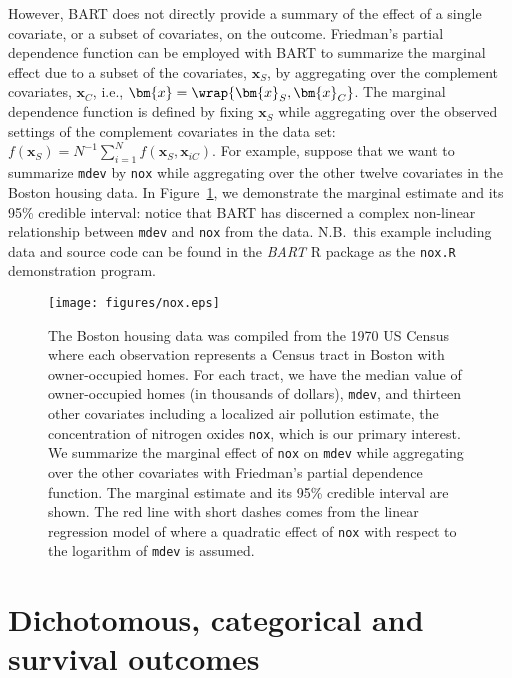 \documentclass[cmbright,doublespace]{WileySTAT-V1}
\theoremstyle{plain}
\begin{document}
However, BART does not directly provide a summary of the effect of a
single covariate, or a subset of covariates, on the outcome.
Friedman's partial dependence function \citep{Frie01} can be employed
with BART to summarize the marginal effect due to a subset of the
covariates, $\bm{x}_S$, by aggregating over the complement covariates,
$\bm{x}_C$, i.e., $\bm{x} =\wrap{\bm{x}_S,\bm{x}_C}$. The marginal
dependence function is defined by fixing $\bm{x}_S$ while aggregating
over the observed settings of the complement covariates in the data
set: $f(\bm{x}_S)={N^{-1}}\sum_{i=1}^N f(\bm{x}_S,\bm{x}_{iC})$.  For
example, suppose that we want to summarize {\tt mdev} by {\tt nox}
while aggregating over the other twelve covariates in the Boston
housing data.  In Figure~\ref{nox}, we demonstrate the marginal
estimate and its 95\% credible interval: notice that BART has
discerned a complex non-linear relationship between {\tt mdev} and
{\tt nox} from the data.  N.B.\ this example including data and source
code can be found in the {\it BART} R package \citep{McCuSpar19} as
the {\tt nox.R} demonstration program.
\begin{figure}[h]
\begin{center}
\texttt{[image: figures/nox.eps]}
\end{center}
\caption{\label{nox}The Boston housing data was compiled from the 1970
  US Census where each observation represents a Census tract in Boston
  with owner-occupied homes. For each tract, we have the median value
  of owner-occupied homes (in thousands of dollars), {\tt mdev}, and
  thirteen other covariates including a localized air pollution
  estimate, the concentration of nitrogen oxides {\tt nox}, which is
  our primary interest.  We summarize the marginal effect of {\tt nox}
  on {\tt mdev} while aggregating over the other covariates with
  Friedman's partial dependence function.  The marginal estimate and
  its 95\% credible interval are shown.  The red line with short
  dashes comes from the linear regression model of \cite{HarrRubi78}
  where a quadratic effect of {\tt nox} with respect to the logarithm
  of {\tt mdev} is assumed.}
\end{figure}

\section{Dichotomous, categorical and survival outcomes}
\label{gbart}
\end{document}
